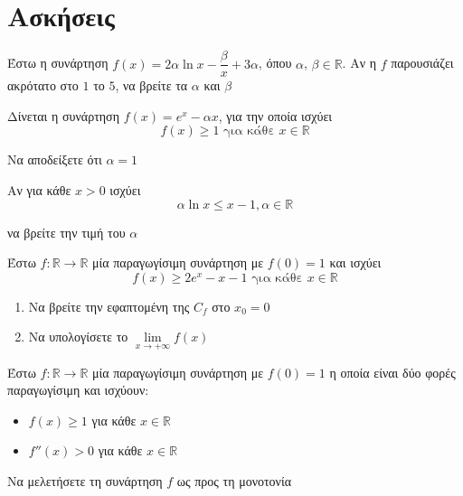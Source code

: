 \documentclass{presentation}
\begin{document}
\section{Ασκήσεις}
\begin{askisi}
    Έστω η συνάρτηση $f(x)=2α\ln x-\dfrac{β}{x}+3α$, όπου $α$, $β\in\mathbb{R}$. Αν η $f$ παρουσιάζει ακρότατο στο $1$ το $5$, να βρείτε τα $α$ και $β$

\end{askisi}

\begin{askisi}
    Δίνεται η συνάρτηση $f(x)=e^x-αx$, για την οποία ισχύει
    $$f(x)\ge 1 \text{ για κάθε } x\in\mathbb{R}$$

    Να αποδείξετε ότι $α=1$

\end{askisi}

\begin{askisi}
    Αν για κάθε $x>0$ ισχύει
    $$α\ln x\le x-1,α\in\mathbb{R}$$

    να βρείτε την τιμή του $α$

\end{askisi}

\begin{askisi}
    Έστω $f:\mathbb{R}\to\mathbb{R}$ μία παραγωγίσιμη συνάρτηση με $f(0)=1$ και ισχύει
    $$f(x)\ge 2e^x-x-1 \text{ για κάθε } x\in\mathbb{R}$$
    \begin{enumerate}
        \item<1-> Να βρείτε την εφαπτομένη της $C_f$ στο $x_0=0$
        \item<2-> Να υπολογίσετε το $\lim\limits_{x \to +\infty}{ f(x) }$
    \end{enumerate}

\end{askisi}

\begin{askisi}
    Έστω $f:\mathbb{R}\to\mathbb{R}$ μία παραγωγίσιμη συνάρτηση με $f(0)=1$ η οποία είναι δύο φορές παραγωγίσιμη και ισχύουν:
    \begin{itemize}
        \item $f(x)\ge 1$ για κάθε $x\in\mathbb{R}$
        \item $f''(x)>0 $ για κάθε $x\in\mathbb{R}$
    \end{itemize}
    Να μελετήσετε τη συνάρτηση $f$ ως προς τη μονοτονία


\end{askisi}
\end{document}
